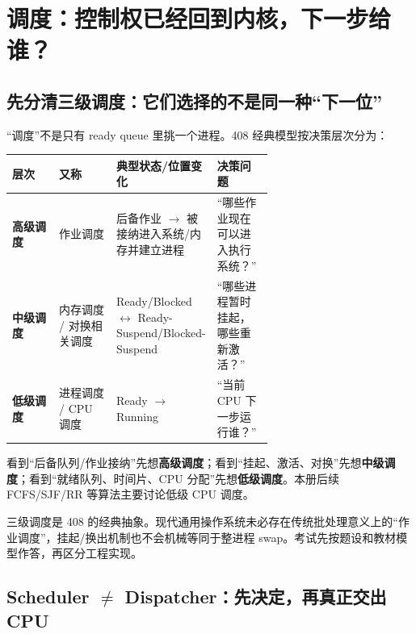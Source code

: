 \documentclass[11pt,a4paper]{ctexart}
\newcommand{\kw}[1]{\textbf{#1}}
\begin{document}
\section{调度：控制权已经回到内核，下一步给谁？}

\subsection{先分清三级调度：它们选择的不是同一种“下一位”}

“调度”不是只有 ready queue 里挑一个进程。408 经典模型按决策层次分为：

\begingroup
\small
\renewcommand{\arraystretch}{1.25}
\setlength{\tabcolsep}{5pt}
\begin{tabularx}{\linewidth}{>{\bfseries}p{0.18\linewidth} p{0.22\linewidth} p{0.24\linewidth} X}
\toprule
层次 & 又称 & 典型状态/位置变化 & 决策问题\\
\midrule
高级调度 & 作业调度 & 后备作业 $\to$ 被接纳进入系统/内存并建立进程 & “哪些作业现在可以进入执行系统？”\\
中级调度 & 内存调度 / 对换相关调度 & Ready/Blocked $\leftrightarrow$ Ready-Suspend/Blocked-Suspend & “哪些进程暂时挂起，哪些重新激活？”\\
低级调度 & 进程调度 / CPU 调度 & Ready $\to$ Running & “当前 CPU 下一步运行谁？”\\
\bottomrule
\end{tabularx}
\endgroup

\begin{corebox}[一眼定位]
看到“后备队列/作业接纳”先想\kw{高级调度}；看到“挂起、激活、对换”先想\kw{中级调度}；看到“就绪队列、时间片、CPU 分配”先想\kw{低级调度}。本册后续 FCFS/SJF/RR 等算法主要讨论低级 CPU 调度。
\end{corebox}

\begin{warn}[教材模型与现代系统边界]
三级调度是 408 的经典抽象。现代通用操作系统未必存在传统批处理意义上的“作业调度”，挂起/换出机制也不会机械等同于整进程 swap。考试先按题设和教材模型作答，再区分工程实现。
\end{warn}

\subsection{Scheduler $\neq$ Dispatcher：先决定，再真正交出 CPU}
\end{document}
